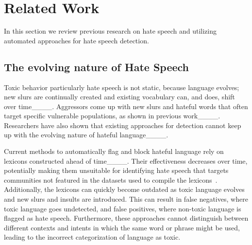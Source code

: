 \section{Related Work}
In this section we review previous research on hate speech and utilizing automated approaches for hate speech detection.

\subsection{The evolving nature of Hate Speech}

Toxic behavior particularly hate speech is not static, because language evolves; new slurs are continually created and existing vocabulary can, and does, shift over time____.
Aggressors come up with new slurs and hateful words that often target specific vulnerable populations, as shown in previous work____. Researchers have also shown that existing approaches for detection cannot keep up with the evolving nature of hateful language____.

Current methods to automatically flag and block hateful language rely on lexicons constructed ahead of time____.
Their effectiveness decreases over time, potentially making them unsuitable for identifying hate speech that targets communities not featured in the datasets used to compile the lexicons~\cite {waseem2016hateful,nobata2016abusive}. Additionally, the lexicons can quickly become outdated as toxic language evolves and new slurs and insults are introduced.
This can result in false negatives, where toxic language goes undetected, and false positives, where non-toxic language is flagged as hate speech.
Furthermore, these approaches cannot distinguish between different contexts and intents in which the same word or phrase might be used, leading to the incorrect categorization of language as toxic. 

